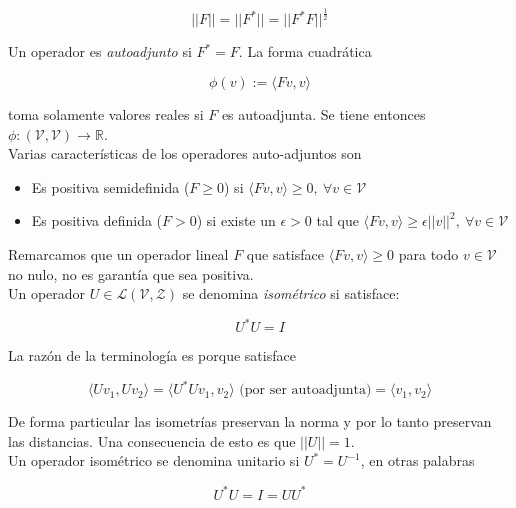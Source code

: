 \begin{equation*}
    ||F|| = ||F^{*}|| = ||F^{*}F||^{\frac{1}{2}}
\end{equation*}

Un operador es \textit{autoadjunto} si $F^{*} = F$. La forma cuadrática

\begin{equation*}
    \phi (v) := \langle F v,v \rangle
\end{equation*}

toma solamente valores reales si $F$ es autoadjunta. Se tiene entonces $\phi:(\mathcal{V},\mathcal{V}) \to \mathbb{R}$. \\

Varias características de los operadores auto-adjuntos son

\begin{itemize}
    \item Es positiva semidefinida ($F \geq 0$) si $\langle F v , v \rangle \geq 0, \ \forall v \in \mathcal{V}$
    \item Es positiva definida ($F > 0$) si existe un $\epsilon > 0$ tal que $\langle F v , v \rangle \geq \epsilon ||v||^2 , \ \forall v \in \mathcal{V}$
\end{itemize}

Remarcamos que un operador lineal $F$ que satisface $\langle F v , v \rangle \geq 0$ para todo $v \in \mathcal{V}$ no nulo, no es garantía que sea positiva. \\

Un operador $U \in \mathcal{L} ( \mathcal{V} , \mathcal{Z} ) $ se denomina \textit{isométrico} si satisface:

\begin{equation*}
    U^{*} U = I
\end{equation*}

La razón de la terminología es porque satisface

\begin{equation*}
    \langle U v_1 , U v_2 \rangle = \langle U^{*} U v_1 , v_2 \rangle \text{ (por ser autoadjunta)} = \langle v_1 , v_2 \rangle
\end{equation*}

De forma particular las isometrías preservan la norma y por lo tanto preservan las distancias. Una consecuencia de esto es que $||U|| = 1$. \\

Un operador isométrico se denomina unitario si $U^{*} = U^{-1}$, en otras palabras 

\begin{equation*}
    U^{*} U = I = U U^{*}
\end{equation*}

